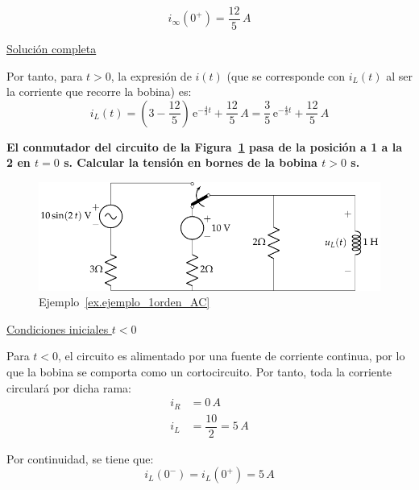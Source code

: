 \begin{example}
  \begin{equation*}
    i_\infty(0^+)=\dfrac{12}{5}\,A
  \end{equation*}
	    
  \underline{Solución completa}
	    
  Por tanto, para $t>0$, la expresión de $i(t)$ (que se corresponde
  con $i_L(t)$ al ser la corriente que recorre la bobina) es:
  \begin{equation*}
    i_L(t)=\left(3-\dfrac{12}{5}\right)\,\mathrm{e}^{-\frac{4}{3}t}+\dfrac{12}{5}\,A=\dfrac{3}{5}\,\mathrm{e}^{-\frac{4}{3}t}+\dfrac{12}{5}\,A
  \end{equation*}
\end{example}
	
\begin{example}\label{ex.ejemplo_1orden_AC}
	
  \textbf{El conmutador del circuito de la
    Figura~\ref{fig:ej_transitorio_1orden_AC} pasa de la posición a 1
    a la 2 en $t = 0$ s. Calcular la tensión en bornes de la bobina
    $t > 0$ s.}
	
  \begin{figure}[H]
    \centering \includegraphics{../figs/ej_transitorio_1orden_AC.pdf}
    \caption{Ejemplo~\ref{ex.ejemplo_1orden_AC}}
    \label{fig:ej_transitorio_1orden_AC}
  \end{figure}
	    
  \underline{Condiciones iniciales $t<0$}
	
  Para $t<0$, el circuito es alimentado por una fuente de corriente
  continua, por lo que la bobina se comporta como un
  cortocircuito. Por tanto, toda la corriente circulará por dicha
  rama:
  \begin{align*}
    i_R&=0 \,A\\
    i_L&=\dfrac{10}{2}=5\,A
  \end{align*}
    
  Por continuidad, se tiene que:
  \begin{equation*}
    i_L(0^-)=i_L(0^+)=5\,A
  \end{equation*}
	

\end{example}
